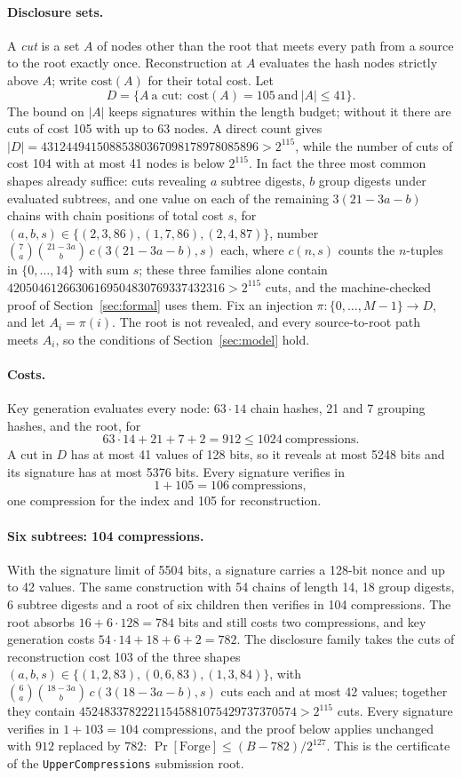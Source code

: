 \documentclass[10pt]{article}
\begin{document}
\paragraph{Disclosure sets.}
A \emph{cut} is a set $A$ of nodes other than the root that meets every path from a source to the root exactly once. Reconstruction at $A$ evaluates the hash nodes strictly above $A$; write $\mathrm{cost}(A)$ for their total cost. Let
\[
D=\{A\ \text{a cut}:\ \mathrm{cost}(A)=105\ \text{and}\ |A|\le41\}.
\]
The bound on $|A|$ keeps signatures within the length budget; without it there are cuts of cost 105 with up to 63 nodes. A direct count gives $|D|=43124494150885380367098178978085896>2^{115}$, while the number of cuts of cost 104 with at most 41 nodes is below $2^{115}$. In fact the three most common shapes already suffice: cuts revealing $a$ subtree digests, $b$ group digests under evaluated subtrees, and one value on each of the remaining $3(21-3a-b)$ chains with chain positions of total cost $s$, for $(a,b,s)\in\{(2,3,86),(1,7,86),(2,4,87)\}$, number $\binom7a\binom{21-3a}b\,c(3(21-3a-b),s)$ each, where $c(n,s)$ counts the $n$-tuples in $\{0,\dots,14\}$ with sum $s$; these three families alone contain $42050461266306169504830769337432316>2^{115}$ cuts, and the machine-checked proof of Section~\ref{sec:formal} uses them. Fix an injection $\pi:\{0,\dots,M-1\}\to D$, and let $A_i=\pi(i)$. The root is not revealed, and every source-to-root path meets $A_i$, so the conditions of Section~\ref{sec:model} hold.

\paragraph{Costs.}
Key generation evaluates every node: $63\cdot14$ chain hashes, 21 and 7 grouping hashes, and the root, for
\[
63\cdot14+21+7+2=912\le1024\ \text{compressions}.
\]
A cut in $D$ has at most 41 values of 128 bits, so it reveals at most 5248 bits and its signature has at most 5376 bits. Every signature verifies in
\[
1+105=106\ \text{compressions},
\]
one compression for the index and 105 for reconstruction.

\paragraph{Six subtrees: 104 compressions.}
With the signature limit of 5504 bits, a signature carries a 128-bit nonce and up to 42 values. The same construction with 54 chains of length 14, 18 group digests, 6 subtree digests and a root of six children then verifies in 104 compressions. The root absorbs $16+6\cdot128=784$ bits and still costs two compressions, and key generation costs $54\cdot14+18+6+2=782$. The disclosure family takes the cuts of reconstruction cost 103 of the three shapes $(a,b,s)\in\{(1,2,83),(0,6,83),(1,3,84)\}$, with $\binom6a\binom{18-3a}b\,c(3(18-3a-b),s)$ cuts each and at most 42 values; together they contain $45248337822211545881075429737370574>2^{115}$ cuts. Every signature verifies in $1+103=104$ compressions, and the proof below applies unchanged with $912$ replaced by $782$: $\Pr[\mathrm{Forge}]\le(B-782)/2^{127}$. This is the certificate of the \texttt{UpperCompressions} submission root.
\end{document}
